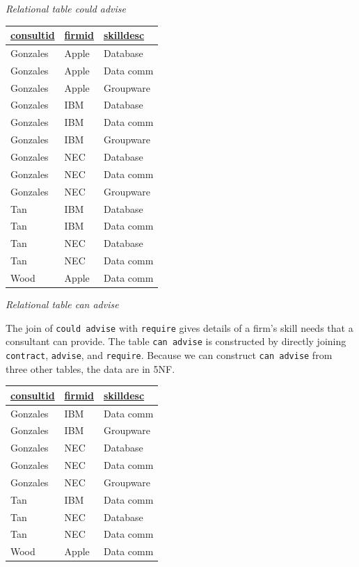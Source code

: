 \documentclass[
]{article}
\begin{document}
\emph{Relational table could advise}

\begin{longtable}[]{@{}lll@{}}
\toprule
\underline{consultid} & \underline{firmid} & \underline{skilldesc} \\
\midrule
\endhead
Gonzales & Apple & Database \\
Gonzales & Apple & Data comm \\
Gonzales & Apple & Groupware \\
Gonzales & IBM & Database \\
Gonzales & IBM & Data comm \\
Gonzales & IBM & Groupware \\
Gonzales & NEC & Database \\
Gonzales & NEC & Data comm \\
Gonzales & NEC & Groupware \\
Tan & IBM & Database \\
Tan & IBM & Data comm \\
Tan & NEC & Database \\
Tan & NEC & Data comm \\
Wood & Apple & Data comm \\
\bottomrule
\end{longtable}

\emph{Relational table can advise}

The join of \texttt{could\ advise} with \texttt{require} gives details of a firm's
skill needs that a consultant can provide. The table \texttt{can\ advise} is
constructed by directly joining \texttt{contract}, \texttt{advise}, and \texttt{require}.
Because we can construct \texttt{can\ advise} from three other tables, the data
are in 5NF.

\begin{longtable}[]{@{}lll@{}}
\toprule
\underline{consultid} & \underline{firmid} & \underline{skilldesc} \\
\midrule
\endhead
Gonzales & IBM & Data comm \\
Gonzales & IBM & Groupware \\
Gonzales & NEC & Database \\
Gonzales & NEC & Data comm \\
Gonzales & NEC & Groupware \\
Tan & IBM & Data comm \\
Tan & NEC & Database \\
Tan & NEC & Data comm \\
Wood & Apple & Data comm \\
\bottomrule
\end{longtable}
\end{document}
